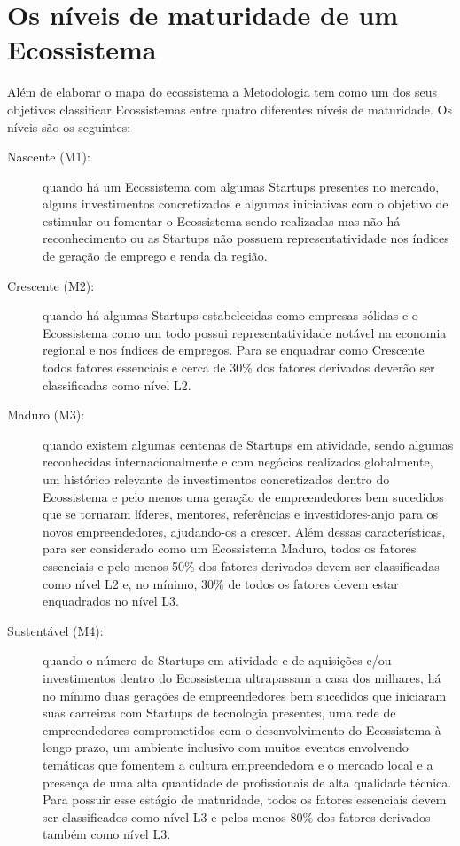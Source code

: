 \section{Os níveis de maturidade de um Ecossistema}
\label{subsection:niveis_de_maturidade_de_um_ecossistema}

Além de elaborar o mapa do ecossistema a Metodologia tem como um dos seus objetivos classificar Ecossistemas entre quatro diferentes níveis de maturidade. Os níveis são os seguintes:

\begin{description}
  \item [Nascente (M1):] quando há um Ecossistema com algumas Startups presentes no mercado, alguns investimentos concretizados e algumas iniciativas com o objetivo de estimular ou fomentar o Ecossistema sendo realizadas mas não há reconhecimento ou as Startups não possuem representatividade nos índices de geração de emprego e renda da região.

  \item [Crescente (M2):] quando há algumas Startups estabelecidas como empresas sólidas e o Ecossistema como um todo possui representatividade notável na economia regional e nos índices de empregos. Para se enquadrar como Crescente todos fatores essenciais e cerca de 30\% dos fatores derivados deverão ser classificadas como nível L2.

  \item [Maduro (M3):] quando existem algumas centenas de Startups em atividade, sendo algumas reconhecidas internacionalmente e com negócios realizados globalmente, um histórico relevante de investimentos concretizados dentro do Ecossistema e pelo menos uma geração de empreendedores bem sucedidos que se tornaram líderes, mentores, referências e investidores-anjo para os novos empreendedores, ajudando-os a crescer. Além dessas características, para ser considerado como um Ecossistema Maduro, todos os fatores essenciais e pelo menos 50\% dos fatores derivados devem ser classificadas como nível L2 e, no mínimo, 30\% de todos os fatores devem estar enquadrados no nível L3.

  \item [Sustentável (M4):] quando o número de Startups em atividade e de aquisições e/ou investimentos dentro do Ecossistema ultrapassam a casa dos milhares, há no mínimo duas gerações de empreendedores bem sucedidos que iniciaram suas carreiras com Startups de tecnologia presentes, uma rede de empreendedores comprometidos com o desenvolvimento do Ecossistema à longo prazo, um ambiente inclusivo com muitos eventos envolvendo temáticas que fomentem a cultura empreendedora e o mercado local e a presença de uma alta quantidade de profissionais de alta qualidade técnica. Para possuir esse estágio de maturidade, todos os fatores essenciais devem ser classificados como nível L3 e pelos menos 80\% dos fatores derivados também como nível L3.
\end{description}

